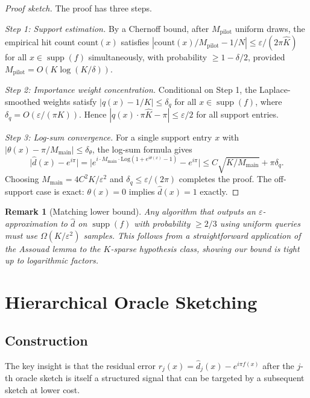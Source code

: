 \documentclass[11pt]{article}
\newtheorem{remark}[theorem]{Remark}
\DeclareMathOperator{\supp}{supp}
\newcommand{\eps}{\varepsilon}
\begin{document}
\begin{proof}[Proof sketch]
The proof has three steps.

\emph{Step 1: Support estimation.}  By a Chernoff bound, after $M_{\mathrm{pilot}}$ uniform draws, the empirical hit count $\mathrm{count}(x)$ satisfies $|\mathrm{count}(x)/M_{\mathrm{pilot}} - 1/N| \leq \eps/(2\pi\hat{K})$ for all $x\in\supp(f)$ simultaneously, with probability $\geq 1-\delta/2$, provided $M_{\mathrm{pilot}} = O(K\log(K/\delta))$.

\emph{Step 2: Importance weight concentration.}  Conditional on Step 1, the Laplace-smoothed weights satisfy $|q(x) - 1/K| \leq \delta_q$ for all $x\in\supp(f)$, where $\delta_q = O(\eps/(\pi K))$.  Hence $|q(x)\cdot\pi\hat{K} - \pi| \leq \eps/2$ for all support entries.

\emph{Step 3: Log-sum convergence.}  For a single support entry $x$ with $|\theta(x) - \pi/M_{\mathrm{main}}| \leq \delta_\theta$, the log-sum formula gives
\[
  \bigl|\hat{d}(x) - e^{i\pi}\bigr| = \bigl|e^{i\cdot M_{\mathrm{main}}\cdot\mathrm{Log}(1 + e^{i\theta(x)}-1)} - e^{i\pi}\bigr| \leq C\sqrt{K/M_{\mathrm{main}}} + \pi\delta_q.
\]
Choosing $M_{\mathrm{main}} = 4C^2K/\eps^2$ and $\delta_q \leq \eps/(2\pi)$ completes the proof.  The off-support case is exact: $\theta(x)=0$ implies $\hat{d}(x) = 1$ exactly.
\end{proof}

\begin{remark}[Matching lower bound]
Any algorithm that outputs an $\eps$-approximation to $\hat{d}$ on $\supp(f)$ with probability $\geq 2/3$ using uniform queries must use $\Omega(K/\eps^2)$ samples.  This follows from a straightforward application of the Assouad lemma to the $K$-sparse hypothesis class, showing our bound is tight up to logarithmic factors.
\end{remark}

\section{Hierarchical Oracle Sketching}\label{sec:hier}

\subsection{Construction}

The key insight is that the residual error $r_j(x) = \hat{d}_{j}(x) - e^{i\pi f(x)}$ after the $j$-th oracle sketch is itself a structured signal that can be targeted by a subsequent sketch at lower cost.
\end{document}
